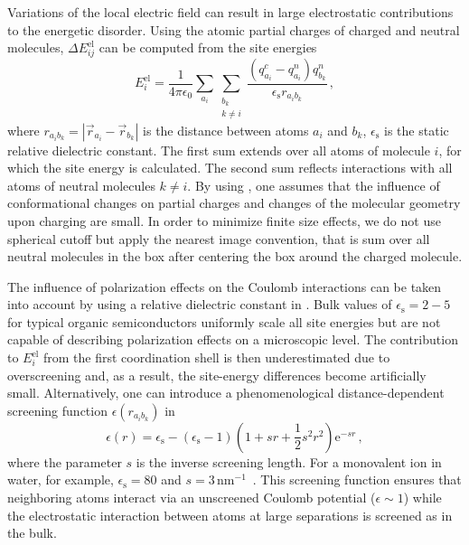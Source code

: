 Variations of the local electric field can result in large electrostatic contributions to the energetic disorder. Using the atomic partial charges of charged and neutral molecules, $\Delta E_{ij}^\text{el}$ can be computed from the site energies~\cite{kirkpatrick_columnar_2008}
\begin{equation}
E_{i}^\text{el}  = \frac{1}{4 \pi \epsilon_0} \sum_{a_i} \sum_{\substack{b_k   \\ k\neq i }}
\frac{ \left( q^c_{a_i} - q^n_{a_i} \right) q^n_{b_k}}{ \epsilon_\text{s} r_{a_i b_k}} 
\, ,
\label{equ:estatic}
\end{equation}
where $r_{a_i b_k}=|\vec{r}_{a_i} - \vec{r}_{b_k}|$ is the distance between atoms $a_i$ and $b_k$,   $\epsilon_\text{s}$ is the static relative dielectric constant.
%
The first sum extends over all atoms of molecule $i$, for which the site energy is calculated. The second sum reflects interactions with all atoms of neutral molecules $k \ne i$. By using , one assumes that the influence of conformational changes on partial charges and changes of the molecular geometry upon charging are small. In order to minimize finite size effects, we do not use spherical cutoff but apply the nearest image convention, that is sum over all neutral molecules in the box after centering the box around the charged molecule. 

The influence of polarization effects on the Coulomb interactions can be taken into account by using a relative dielectric constant in . Bulk values of  $\epsilon_\text{s} = 2-5$ for typical organic semiconductors uniformly scale all site energies but are not capable of describing polarization effects on a microscopic level. 
The contribution to $E_i^\text{el}$ from the first coordination shell is then underestimated due to overscreening and, as a result, the site-energy differences become artificially small. Alternatively, one can introduce a phenomenological distance-dependent screening function $\epsilon(r_{a_i b_k})$ in~~\cite{nagata_atomistic_2008}
\begin{equation}
\epsilon(r)=\epsilon_{\text{s}} - (\epsilon_{\text{s}} - 1)
\left( 1 + sr + \frac{1}{2}s^2r^2 \right) 
\mathrm{e}^{ -sr}\,,
\label{equ:epss}
\end{equation}
where the parameter $s$ is the inverse screening length. For a monovalent ion in water, for example, $\epsilon_{\text{s}}=80$ and $s=3\,\textrm{nm}^{-1}$~\cite{daggett_molecular_1991}. This screening function ensures that neighboring atoms interact via an unscreened Coulomb potential ($\epsilon \sim 1$) while the electrostatic interaction between atoms at large separations is screened as in the bulk. 

